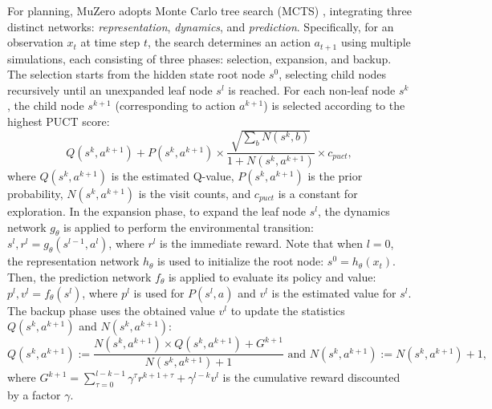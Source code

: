 For planning, MuZero adopts Monte Carlo tree search (MCTS) \cite{kocsis_bandit_2006, coulom_efficient_2007, browne_survey_2012}, integrating three distinct networks: \textit{representation}, \textit{dynamics}, and \textit{prediction}.
Specifically, for an observation $x_t$ at time step $t$, the search determines an action $a_{t+1}$ using multiple simulations, each consisting of three phases: selection, expansion, and backup.
The selection starts from the hidden state root node $s^0$, selecting child nodes recursively until an unexpanded leaf node $s^l$ is reached.
For each non-leaf node $s^k$, the child node $s^{k+1}$ (corresponding to action $a^{k+1}$) is selected according to the highest PUCT \cite{rosin_multiarmed_2011, silver_mastering_2017} score:
\begin{equation}\label{eq:puct}
Q(s^k, a^{k+1}) + P(s^k, a^{k+1}) \times \frac{\sqrt{\sum_b N(s^k, b)}}{1 + N(s^k, a^{k+1})} \times c_{puct},
\end{equation}
where $Q(s^k,a^{k+1})$ is the estimated Q-value, $P(s^k,a^{k+1})$ is the prior probability, $N(s^k,a^{k+1})$ is the visit counts, and $c_{puct}$ is a constant for exploration.
In the expansion phase, to expand the leaf node $s^l$, the dynamics network $g_\theta$ is applied to perform the environmental transition: $s^l, r^l = g_\theta(s^{l-1}, a^l)$, where $r^l$ is the immediate reward.
Note that when $l=0$, the representation network $h_\theta$ is used to initialize the root node: $s^0 = h_\theta(x_t)$.
Then, the prediction network $f_\theta$ is applied to evaluate its policy and value: $p^l, v^l = f_\theta(s^l)$, where $p^l$ is used for $P(s^l, a)$ and $v^l$ is the estimated value for $s^l$.
The backup phase uses the obtained value $v^l$ to update the statistics $Q(s^k,a^{k+1})$ and $N(s^k,a^{k+1})$:
\begin{equation}\label{eq:mcts_backup}
Q(s^k,a^{k+1}) := \frac{N(s^k,a^{k+1}) \times Q(s^k,a^{k+1}) + G^{k+1}}{N(s^k,a^{k+1}) + 1} \text{ and }
N(s^k,a^{k+1}) := N(s^k,a^{k+1}) + 1,
\end{equation}
where $G^{k+1} = \sum_{\tau=0}^{l-k-1}{\gamma ^ \tau r^{k + 1 + \tau}} + \gamma^{l - k} v^l$ is the cumulative reward discounted by a factor $\gamma$.

